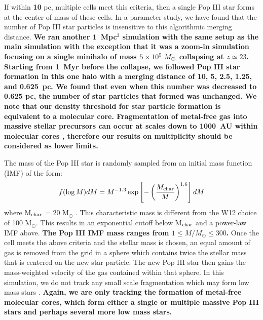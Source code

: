 \documentclass[fleqn,usenatbib]{mnras}
\begin{document}
If within \textbf{10} pc, multiple cells meet this criteria, then a single Pop III star forms at the center of mass of these cells. In a parameter study, we have found that the number of Pop III star particles is insensitive to this algorithmic merging distance. \textbf{We ran another 1~Mpc$^3$ simulation with the same setup as the main simulation with the exception that it was a zoom-in simulation focusing on a single minihalo of mass $5 \times 10^5~\Ms$ collapsing at $z \simeq 23$.  Starting from 1~Myr before the collapse, we followed Pop III star formation in this one halo with a merging distance of 10, 5, 2.5, 1.25, and 0.625~pc.  We found that even when this number was decreased to 0.625 pc, the number of star particles that formed was unchanged.  We note that our density threshold for star particle formation is equivalent to a molecular core.  Fragmentation of metal-free gas into massive stellar precursors can occur at scales down to 1000~AU within molecular cores \citep[e.g.][]{Turk09, Stacy11}, therefore our results on multiplicity should be considered as lower limits.}

The mass of the Pop III star is randomly sampled from an initial mass function (IMF) of the form:
\begin{equation} \label{IMF}
	f(\log M)dM = M^{-1.3} \exp \left[-\left( \frac{M_{\rm char}}{M}\right)^{1.6} \right]dM
\end{equation}
where M$_{\rm char}$ = 20 M$_{\odot}$ \citep{Hirano17}. This characteristic mass is different from the W12 choice of 100 M$_{\odot}$. This results in an exponential cutoff below M$_{\rm char}$ and a power-law IMF above. \textbf{The Pop III IMF mass ranges from $1 \leq M / M_{\odot} \leq 300$. }Once the cell meets the above criteria and the stellar mass is chosen, an equal amount of gas is removed from the grid in a sphere which contains twice the stellar mass that is centered on the new star particle. The new Pop III star then gains the mass-weighted velocity of the gas contained within that sphere. In this simulation, we do not track any small scale fragmentation which may form low mass stars \citep{Greif11_P3Cluster}. \textbf{Again, we are only tracking the formation of metal-free molecular cores, which form either a single or multiple massive Pop III stars and perhaps several more low mass stars.}
\end{document}
